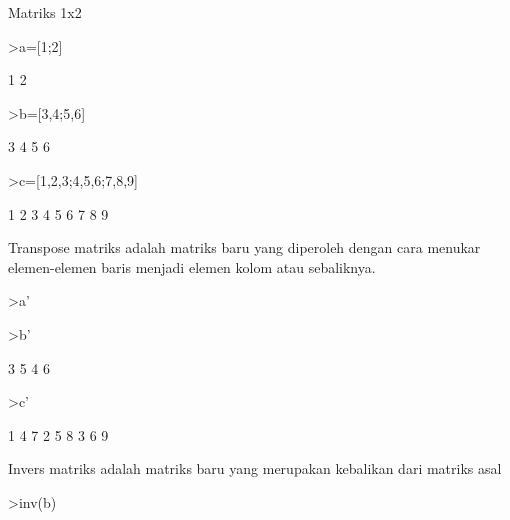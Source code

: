 \documentclass[a4paper,10pt]{article}
\begin{document}
\begin{eulernotebook}
\begin{eulercomment}
\begin{eulercomment}
\begin{eulercomment}
\begin{eulercomment}
\begin{eulercomment}
Matriks 1x2
\end{eulercomment}
\begin{eulerprompt}
>a=[1;2]
\end{eulerprompt}
\begin{euleroutput}
              1 
              2 
\end{euleroutput}
\begin{eulerprompt}
>b=[3,4;5,6]
\end{eulerprompt}
\begin{euleroutput}
              3             4 
              5             6 
\end{euleroutput}
\begin{eulerprompt}
>c=[1,2,3;4,5,6;7,8,9]
\end{eulerprompt}
\begin{euleroutput}
              1             2             3 
              4             5             6 
              7             8             9 
\end{euleroutput}
\begin{eulercomment}
Transpose matriks adalah matriks baru yang diperoleh dengan cara
menukar elemen-elemen baris menjadi elemen kolom atau sebaliknya.
\end{eulercomment}
\begin{eulerprompt}
>a'
\end{eulerprompt}
\begin{euleroutput}
  [1,  2]
\end{euleroutput}
\begin{eulerprompt}
>b'
\end{eulerprompt}
\begin{euleroutput}
              3             5 
              4             6 
\end{euleroutput}
\begin{eulerprompt}
>c'
\end{eulerprompt}
\begin{euleroutput}
              1             4             7 
              2             5             8 
              3             6             9 
\end{euleroutput}
\begin{eulercomment}
Invers matriks adalah matriks baru yang merupakan kebalikan dari
matriks asal
\end{eulercomment}
\begin{eulerprompt}
>inv(b)
\end{eulerprompt}
\begin{euleroutput}

\end{euleroutput}
\end{eulercomment}
\end{eulercomment}
\end{eulercomment}
\end{eulercomment}
\end{eulernotebook}
\end{document}
